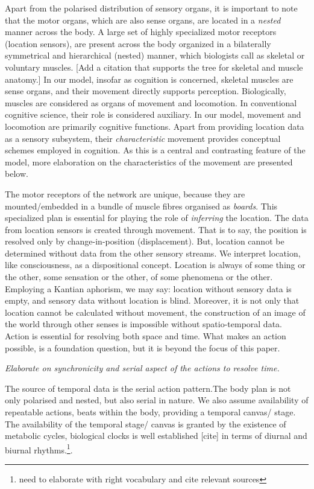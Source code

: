 Apart from the polarised distribution of sensory organs, it is important to note that the motor organs, which are also sense organs, are located in a \textit{nested} manner across the body.
A large set of highly specialized motor receptors (location sensors), are present across the body organized in a bilaterally symmetrical and hierarchical (nested) manner, which biologists call as skeletal or voluntary muscles. [Add a citation that supports the tree for skeletal and muscle anatomy.] In our model, insofar as cognition is concerned, skeletal muscles are sense organs, and their movement directly supports perception.  Biologically, muscles are considered as organs of movement and locomotion. In conventional cognitive science, their role is considered auxiliary. In our model, movement and locomotion are primarily cognitive functions. Apart from providing location data as a sensory subsystem, their \textit{characteristic} movement provides conceptual schemes employed in cognition. As this is a central and contrasting feature of the model, more elaboration on the characteristics of the movement are presented below.

The motor receptors of the network are unique, because they are mounted/embedded in a bundle of muscle fibres organised as \textit{boards}. This specialized plan is essential for playing the role of \textit{inferring} the location. The data from location sensors is created through movement. That is to say, the position is resolved only by change-in-position (displacement). But, location cannot be determined without data from the other sensory streams. We interpret location, like consciousness, as a dispositional concept. Location is always of some thing or the other, some sensation or the other, of some phenomena or the other. Employing a Kantian aphorism, we may say: location without sensory data is empty, and sensory data without location is blind. Moreover, it is not only that location cannot be calculated without movement, the construction of an image of the world through other senses is impossible without spatio-temporal data. Action is essential for resolving both space and time. What makes an action possible, is a foundation question, but it is beyond the focus of this paper.

\emph{Elaborate on synchronicity and serial aspect of the actions to resolve time.}

The source of temporal data is the serial action pattern.The body plan is not only polarised and nested, but also serial in nature. We also assume availability of repeatable actions, beats within the body, providing a temporal canvas/ stage. The availability of the temporal stage/ canvas is granted by the existence of metabolic cycles, biological clocks is well established [cite] in terms of diurnal and biurnal rhythms.\footnote{need to elaborate with right vocabulary and cite relevant sources}.


